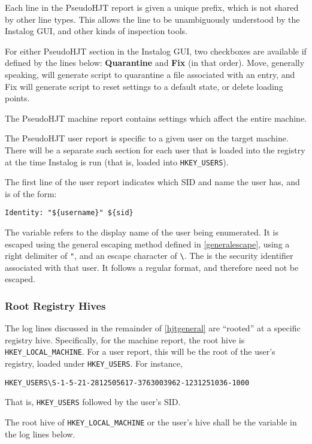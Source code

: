 Each line in the PseudoHJT report is given a unique prefix, which is not shared
by other line types. This allows the line to be unambiguously understood by the
Instalog GUI, and other kinds of inspection tools.

For either PseudoHJT section in the Instalog GUI, two checkboxes are available
if defined by the lines below: \textbf{Quarantine} and \textbf{Fix} (in that
order).  Move, generally speaking, will generate script to quarantine a file
associated with an entry, and Fix will generate script to reset settings to a
default state, or delete loading points.

The PseudoHJT machine report contains settings which affect the entire machine.

The PseudoHJT user report is specific to a given user on the target machine.
There will be a separate such section for each user that is loaded into the
registry at the time Instalog is run (that is, loaded into \verb|HKEY_USERS|).

The first line of the user report indicates which SID and name the user has, and
is of the form:
\begin{verbatim}
Identity: "${username}" ${sid}
\end{verbatim}

The variable  refers to the display name of the user being
enumerated. It is escaped using the general escaping method defined in
\ref{generalescape}, using a right delimiter of \verb|"|, and an escape
character of \verb|\|. The  is the security identifier associated with
that user. It follows a regular format, and therefore need not be escaped.

\subsubsection{Root Registry Hives}
The log lines discussed in the remainder of \ref{hjtgeneral} are ``rooted'' at a
specific registry hive. Specifically, for the machine report, the root hive is
\verb|HKEY_LOCAL_MACHINE|. For a user report, this will be the root of the
user's registry, loaded under \verb|HKEY_USERS|. For instance,
\begin{verbatim}
HKEY_USERS\S-1-5-21-2812505617-3763003962-1231251036-1000
\end{verbatim}
That is, \verb|HKEY_USERS| followed by the user's SID.

The root hive of \verb|HKEY_LOCAL_MACHINE| or the user's hive shall be
the variable  in the log lines below.

